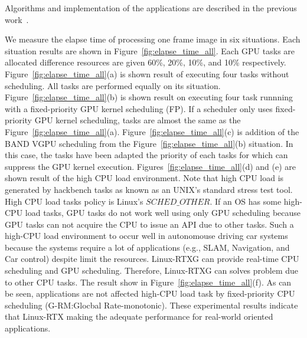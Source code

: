 Algorithms and implementation of the applications are described in the previous work~\cite{hirabayashi:cpsna2013}.

We measure the elapse time of processing one frame image in six situations.
Each situation results are shown in Figure~\ref{fig:elapse_time_all}.
Each GPU tasks are allocated difference resources are given 60\%, 20\%, 10\%, and 10\% respectively.
Figure~\ref{fig:elapse_time_all}(a) is shown result of executing four tasks without scheduling.
All tasks are performed equally on its situation.
Figure~\ref{fig:elapse_time_all}(b) is shown result on executing four task runnning with a fixed-priority GPU kernel scheduling (FP).
If a scheduler only uses fixed-priority GPU kernel scheduling, tasks are almost the same as the Figure~\ref{fig:elapse_time_all}(a).
Figure~\ref{fig:elapse_time_all}(c) is addition of the BAND VGPU scheduling from the Figure~\ref{fig:elapse_time_all}(b) situation.
In this case, the tasks have been adapted the priority of each tasks for which can suppress the GPU kernel execution.
Figures~\ref{fig:elapse_time_all}(d) and (e) are shown result of the high CPU load environment.
Note that high CPU load is generated by hackbench tasks as known as an UNIX's standard stress test tool.
High CPU load tasks policy is Linux's $SCHED\_OTHER$.
If an OS has some high-CPU load tasks, GPU tasks do not work well using only GPU scheduling
because GPU tasks can not acquire the CPU to issue an API due to other tasks.
Such a high-CPU load environment to occur well in autonomouse driving car systems because the systems require a lot of applications (e.g., SLAM, Navigation, and Car control) despite limit the resources.
Linux-RTXG can provide real-time CPU scheduling and GPU scheduling.
Therefore, Linux-RTXG can solves problem due to other CPU tasks.
The result show in Figure~\ref{fig:elapse_time_all}(f).
As can be seen, applications are not affected high-CPU load task by fixed-priority CPU scheduling (G-RM:Glocbal Rate-monotonic).
These experimental results indicate that Linux-RTX making the adequate performance for real-world oriented applications.


